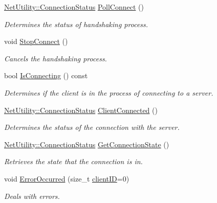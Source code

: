 \begin{DoxyCompactItemize}
\hyperlink{class_net_utility_a7eae52138f8bd597ffc67ebf07e86b6d}{NetUtility::ConnectionStatus} \hyperlink{class_net_instance_client_a9f96ef6d39ce2b6a23e3a1f7fa13599f}{PollConnect} ()
\begin{DoxyCompactList}\small\item\em Determines the status of handshaking process. \item\end{DoxyCompactList}\item 
void \hyperlink{class_net_instance_client_aa85847af595e3e562ba00b4ec2f2f3e0}{StopConnect} ()
\begin{DoxyCompactList}\small\item\em Cancels the handshaking process. \item\end{DoxyCompactList}\item 
bool \hyperlink{class_net_instance_client_a06bd377c8014d5d0b684db8f80fb5a06}{IsConnecting} () const 
\begin{DoxyCompactList}\small\item\em Determines if the client is in the process of connecting to a server. \item\end{DoxyCompactList}\item 
\hyperlink{class_net_utility_a7eae52138f8bd597ffc67ebf07e86b6d}{NetUtility::ConnectionStatus} \hyperlink{class_net_instance_client_aaf717e0f3dbe49a86b8473ad093c7176}{ClientConnected} ()
\begin{DoxyCompactList}\small\item\em Determines the status of the connection with the server. \item\end{DoxyCompactList}\item 
\hyperlink{class_net_utility_a7eae52138f8bd597ffc67ebf07e86b6d}{NetUtility::ConnectionStatus} \hyperlink{class_net_instance_client_ad8d5d608125edbbd11283b5b31031ea5}{GetConnectionState} ()
\begin{DoxyCompactList}\small\item\em Retrieves the state that the connection is in. \item\end{DoxyCompactList}\item 
void \hyperlink{class_net_instance_client_a55e57774e40393af927fa2a517a2a2a8}{ErrorOccurred} (size\_\-t \hyperlink{class_net_instance_client_abc188a88da7ab851bc3ac4d9287fe342}{clientID}=0)
\begin{DoxyCompactList}\small\item\em Deals with errors. \item\end{DoxyCompactList}\item 

\end{DoxyCompactItemize}
